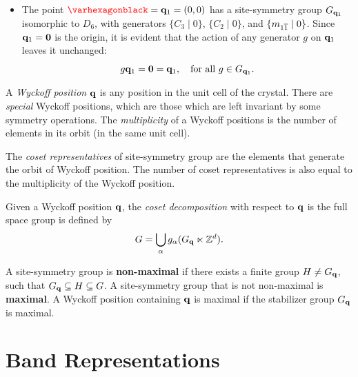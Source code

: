 \begin{example}
\begin{itemize}
\item The point \(\textcolor{red}{\varhexagonblack} = \q_1 = (0,0)\) has a site-symmetry group \(G_{{\vb{q}}_1}\) isomorphic to \(D_6\), with generators \(\{C_3 \mid 0\}\), \(\{C_2 \mid 0\}\), and \(\{m_{1\overline{1}} \mid 0\}\). Since \({\vb{q}}_1 = {\vb{0}}\) is the origin, it is evident that the action of any generator \(g\) on \({\vb{q}}_1\) leaves it unchanged:
\begin{equation} \label{eq:site-symmetry-q1}
g {\vb{q}}_1 = {\vb{0}} = {\vb{q}}_1, \quad \text{for all } g \in G_{{\vb{q}}_1}.
\end{equation}
\end{itemize}

\end{example}

\begin{definition} \label{def:wyckpos}
A \textit{Wyckoff position} ${\vb{q}}$ is any position in the unit cell of the crystal. There are \textit{special} Wyckoff positions, which are those which are left invariant by some symmetry operations. The \textit{multiplicity} of a Wyckoff positions is the number of elements in its orbit (in the same unit cell).
\end{definition}

\begin{definition} \label{def:cosetrep}
The \textit{coset representatives} of site-symmetry group are the elements that generate the orbit of Wyckoff position. The number of coset representatives is also equal to the multiplicity of the Wyckoff position.
\end{definition}

\begin{definition} \label{def:cosetdecomp}
Given a Wyckoff position ${\vb{q}}$, the \textit{coset decomposition} with respect to ${\vb{q}}$ is the full space group is defined by
$$
G = \bigcup_\alpha g_\alpha (G_{{\vb{q}}} \ltimes {\mathbb{Z}}^d).
$$
\end{definition}

\begin{definition}
A site-symmetry group is \textbf{non-maximal} if there exists a finite group $H \neq G_{\vb{q}}$, such that $G_{\vb{q}} \subseteq H \subseteq G$. A site-symmetry group that is not non-maximal is \textbf{maximal}. A Wyckoff position containing ${\vb{q}}$ is maximal if the stabilizer group $G_{\vb{q}}$ is maximal.
\end{definition}

\section{Band Representations}

